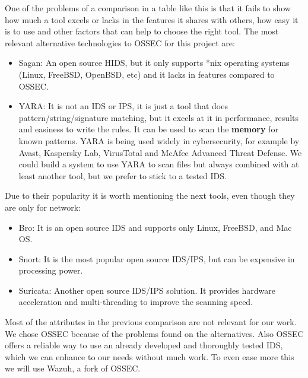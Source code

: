 \linej
\linej
One of the problems of a comparison in a table like this is that it fails to show how much a tool excels or lacks in the features it shares with others, how easy it is to use and other factors that can help to choose the right tool. The most relevant alternative technologies to OSSEC for this project are\cite{comparison_tools}:
\begin{itemize}
	\item Sagan: An open source HIDS, but it only supports *nix operating systems (Linux, FreeBSD, OpenBSD, etc) and it lacks in features compared to OSSEC.
	\item YARA: It is not an IDS or IPS, it is just a tool that does pattern/string/signature matching, but it excels at it in performance, results and easiness to write the rules. It can be used to scan the \textbf{memory} for known patterns. YARA is being used widely in cybersecurity, for example by Avast, Kaspersky Lab, VirusTotal and McAfee Advanced Threat Defense\cite{who_is_using_yara}. We could build a system to use YARA to scan files but always combined with at least another tool, but we prefer to stick to a tested IDS.
\end{itemize}
\linej
Due to their popularity it is worth mentioning the next tools, even though they are only for network:
\begin{itemize}
	\item Bro: It is an open source IDS and supports only Linux, FreeBSD, and Mac OS.
	\item Snort: It is the most popular open source IDS/IPS, but can be expensive in processing power.
	\item Suricata: Another open source IDS/IPS solution. It provides hardware acceleration and multi-threading to improve the scanning speed.
\end{itemize}
\linej
Most of the attributes in the previous comparison are not relevant for our work.
We chose OSSEC because of the problems found on the alternatives.
Also OSSEC offers a reliable way to use an already developed and thoroughly tested IDS, which we can enhance to our needs without much work.
To even ease more this we will use Wazuh, a fork of OSSEC.

